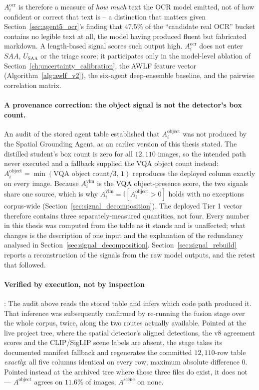 \documentclass[12pt,a4paper]{report}
\begin{document}
\begin{enumerate}
$A_i^{\text{ocr}}$ is therefore a measure of \emph{how much} text the OCR model emitted, not of how confident or correct that text is -- a distinction that matters given Section~\ref{sec:agent5_ocr}'s finding that $47.5\%$ of the ``candidate real OCR'' bucket contains no legible text at all, the model having produced fluent but fabricated markdown. A length-based signal scores such output high. $A_i^{\text{ocr}}$ does not enter $SAA$, $U_{\text{SAA}}$ or the triage score; it participates only in the model-level ablation of Section~\ref{ch:uncertainty_calibration}, the AWLF feature vector (Algorithm~\ref{alg:awlf_v2}), the six-agent deep-ensemble baseline, and the pairwise correlation matrix. \paragraph{A provenance correction: the object signal is not the detector's box count.} An audit of the stored agent table established that $A_i^{\text{object}}$ was not produced by the Spatial Grounding Agent, as an earlier version of this thesis stated. The distilled student's box count is zero for all $12{,}110$ images, so the intended path never executed and a fallback supplied the VQA object count instead: $A_i^{\text{object}} = \min(\text{VQA object count}/3,\,1)$ reproduces the deployed column exactly on every image. Because $A_i^{\text{vlm}}$ is the VQA object-presence score, the two signals share one source, which is why $A_i^{\text{vlm}} = \mathbb{I}[A_i^{\text{object}} > 0]$ holds with no exceptions corpus-wide (Section~\ref{sec:signal_decomposition}). The deployed Tier 1 vector therefore contains three separately-measured quantities, not four. Every number in this thesis was computed from the table as it stands and is unaffected; what changes is the description of one input and the explanation of the redundancy analysed in Section~\ref{sec:signal_decomposition}. Section~\ref{sec:signal_rebuild} reports a reconstruction of the signals from the raw model outputs, and the retest that followed.

\paragraph{Verified by execution, not by inspection}: The audit above reads the stored table and infers which code path produced it. That inference was subsequently confirmed by re-running the fusion stage over the whole corpus, twice, along the two routes actually available. Pointed at the live project tree, where the spatial detector's aligned detections, the v8 agreement scores and the CLIP/SigLIP scene labels are absent, the stage takes its documented manifest fallback and regenerates the committed $12{,}110$-row table \emph{exactly}: all five columns identical on every row, maximum absolute difference $0$. Pointed instead at the archived tree where those three files do exist, it does not --- $A^{\text{object}}$ agrees on $11.6\%$ of images, $A^{\text{scene}}$ on none.


\end{enumerate}
\end{document}
